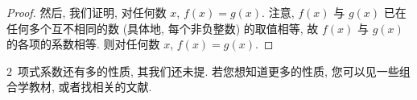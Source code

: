 \documentclass[../libro.tex]{subfiles}
\begin{document}
\begin{proof}
    然后, 我们证明, 对任何数 \(x\), \(f(x) = g(x)\).
    注意, \(f(x)\) 与 \(g(x)\) 已在任何多个互不相同的数
    (具体地, 每个非负整数)
    的取值相等,
    故 \(f(x)\) 与 \(g(x)\) 的各项的系数相等.
    则对任何数 \(x\), \(f(x) = g(x)\).
\end{proof}

\(2\)~项式系数还有多的性质, 其我们还未提.
若您想知道更多的性质,
您可以见一些组合学教材,
或者找相关的文献.
\end{document}
